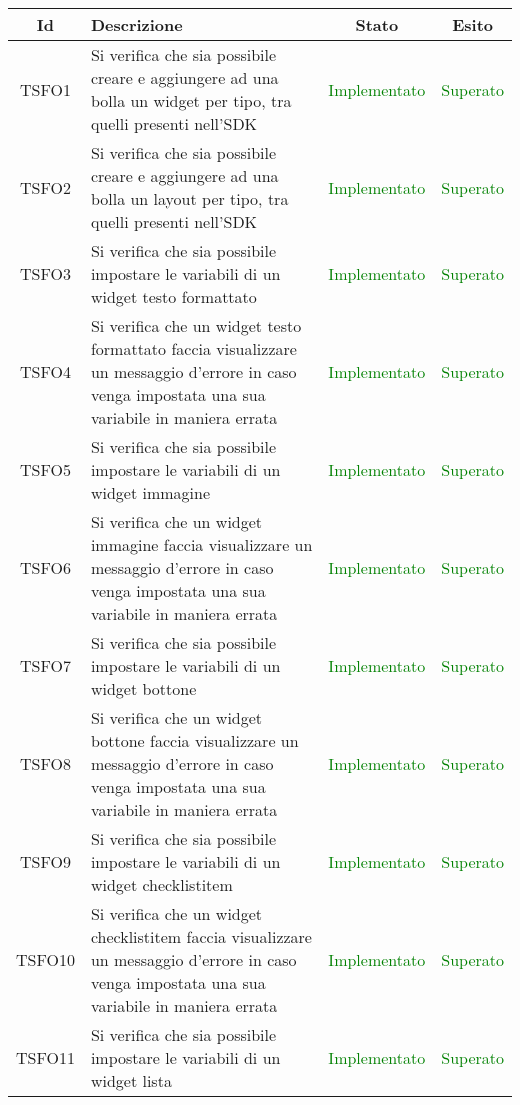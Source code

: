 \begin{center}
	\begin{longtable}{|c|>{\centering}m{10cm}|c|c|}\hline
		Id & Descrizione & Stato & Esito\\ \hline
		TSFO1 & Si verifica che sia possibile creare e aggiungere ad una bolla un widget per tipo, tra quelli presenti nell'SDK & \textcolor{Green}{Implementato} & \textcolor{Green}{Superato} \\ \hline
		TSFO2 & Si verifica che sia possibile creare e aggiungere ad una bolla un layout per tipo, tra quelli presenti nell'SDK & \textcolor{Green}{Implementato} & \textcolor{Green}{Superato} \\ \hline
		TSFO3 & Si verifica che sia possibile impostare le variabili di un widget testo formattato & \textcolor{Green}{Implementato} & \textcolor{Green}{Superato} \\ \hline
		TSFO4 & Si verifica che un widget testo formattato faccia visualizzare un messaggio d'errore in caso venga impostata una sua variabile in maniera errata & \textcolor{Green}{Implementato} & \textcolor{Green}{Superato} \\ \hline
		TSFO5 & Si verifica che sia possibile impostare le variabili di un widget immagine & \textcolor{Green}{Implementato} & \textcolor{Green}{Superato} \\ \hline
		TSFO6 & Si verifica che un widget immagine faccia visualizzare un messaggio d'errore in caso venga impostata una sua variabile in maniera errata & \textcolor{Green}{Implementato} & \textcolor{Green}{Superato} \\ \hline
		TSFO7 & Si verifica che sia possibile impostare le variabili di un widget bottone & \textcolor{Green}{Implementato} & \textcolor{Green}{Superato} \\ \hline
		TSFO8 & Si verifica che un widget bottone faccia visualizzare un messaggio d'errore in caso venga impostata una sua variabile in maniera errata & \textcolor{Green}{Implementato} & \textcolor{Green}{Superato} \\ \hline
		TSFO9 & Si verifica che sia possibile impostare le variabili di un widget checklistitem & \textcolor{Green}{Implementato} & \textcolor{Green}{Superato} \\ \hline
		TSFO10 & Si verifica che un widget checklistitem faccia visualizzare un messaggio d'errore in caso venga impostata una sua variabile in maniera errata & \textcolor{Green}{Implementato} & \textcolor{Green}{Superato} \\ \hline
		TSFO11 & Si verifica che sia possibile impostare le variabili di un widget lista & \textcolor{Green}{Implementato} & \textcolor{Green}{Superato} \\ \hline

\end{longtable}
\end{center}
